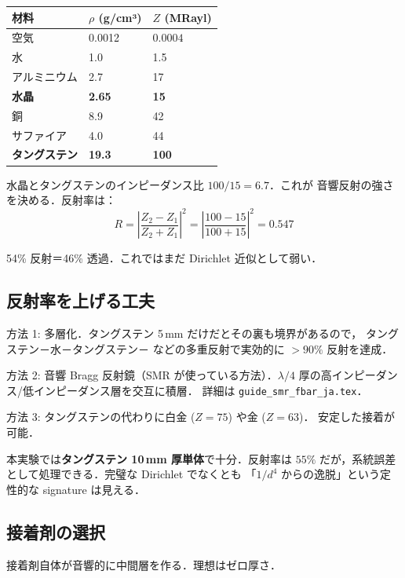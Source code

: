 \documentclass[11pt,a4paper]{article}
\begin{document}
\begin{center}
\begin{tabular}{lll}
\toprule
材料 & $\rho$ (g/cm³) & $Z$ (MRayl) \\
\midrule
空気 & 0.0012 & $0.0004$ \\
水 & 1.0 & 1.5 \\
アルミニウム & 2.7 & 17 \\
\textbf{水晶} & \textbf{2.65} & \textbf{15} \\
銅 & 8.9 & 42 \\
サファイア & 4.0 & 44 \\
\textbf{タングステン} & \textbf{19.3} & \textbf{100} \\
\bottomrule
\end{tabular}
\end{center}

水晶とタングステンのインピーダンス比 $100/15 = 6.7$．これが
音響反射の強さを決める．反射率は：
\begin{equation}
R = \left|\frac{Z_2 - Z_1}{Z_2 + Z_1}\right|^2 = \left|\frac{100-15}{100+15}\right|^2 = 0.547
\end{equation}

54\% 反射＝46\% 透過．これではまだ Dirichlet 近似として弱い．

\subsection{反射率を上げる工夫}

方法 1: 多層化．タングステン 5\,mm だけだとその裏も境界があるので，
タングステン－水－タングステン－ などの多重反射で実効的に
$>90\%$ 反射を達成．

方法 2: 音響 Bragg 反射鏡（SMR が使っている方法）．$\lambda/4$
厚の高インピーダンス/低インピーダンス層を交互に積層．
詳細は \texttt{guide\_smr\_fbar\_ja.tex}．

方法 3: タングステンの代わりに白金 ($Z = 75$) や金 ($Z = 63$)．
安定した接着が可能．

本実験では\textbf{タングステン 10\,mm 厚単体}で十分．反射率は
$55\%$ だが，系統誤差として処理できる．完璧な Dirichlet でなくとも
「$1/d^4$ からの逸脱」という定性的な signature は見える．

\subsection{接着剤の選択}

接着剤自体が音響的に中間層を作る．理想はゼロ厚さ．
\end{document}
